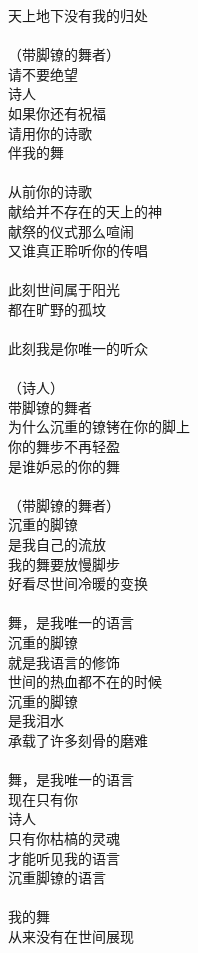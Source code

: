 天上地下没有我的归处\\
\\
（带脚镣的舞者）\\
请不要绝望\\
诗人\\
如果你还有祝福\\
请用你的诗歌\\
伴我的舞\\
\\
从前你的诗歌\\
献给并不存在的天上的神\\
献祭的仪式那么喧闹\\
又谁真正聆听你的传唱\\
\\
此刻世间属于阳光\\
都在旷野的孤坟\\
\\
此刻我是你唯一的听众\\
\\
（诗人）\\
带脚镣的舞者\\
为什么沉重的镣铐在你的脚上\\
你的舞步不再轻盈\\
是谁妒忌的你的舞\\
\\
（带脚镣的舞者）\\
沉重的脚镣\\
是我自己的流放\\
我的舞要放慢脚步\\
好看尽世间冷暖的变换\\
\\
舞，是我唯一的语言\\
沉重的脚镣\\
就是我语言的修饰\\
世间的热血都不在的时候\\
沉重的脚镣\\
是我泪水\\
承载了许多刻骨的磨难\\
\\
舞，是我唯一的语言\\
现在只有你\\
诗人\\
只有你枯槁的灵魂\\
才能听见我的语言\\
沉重脚镣的语言\\
\\
我的舞\\
从来没有在世间展现\\
